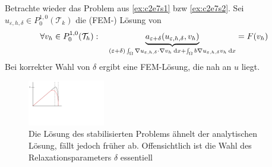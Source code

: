 \documentclass[../skript.tex]{subfiles}
\begin{document}
 \begin{example}\label{ex:c2e7s3}
 	Betrachte wieder das Problem aus \cref{ex:c2e7s1} bzw \cref{ex:c2e7s2}. Sei $u_{\varepsilon,h,\delta}\in P^{1,0}_0(\mathcal{T}_k)$ die (FEM-) Lösung von
 	\[
 		\forall v_h\in P^{1,0}_0(\mathcal{T}_h):\quad \underbrace{a_{\varepsilon+\delta}(u_{\varepsilon,h,\delta}, v_h)}_{(\varepsilon+\delta)\int_\Omega\nabla u_{\varepsilon,h,\delta} \cdot\nabla v_h\:\mathrm{d}x + \int_\Omega b\nabla u_{\varepsilon,h,\delta}v_h\:\mathrm{d}x} = F(v_h)
 	\] 
 	Bei korrekter Wahl von $\delta$ ergibt eine FEM-Lösung, die nah an $u$ liegt.
 	\begin{figure}[ht]
 	\centering
 		\includegraphics[width=0.3\textwidth]{Images/5-12-stabilisiert.pdf}
 		\caption{Die Lösung des stabilisierten Problems ähnelt der analytischen Lösung, fällt jedoch früher ab. Offensichtlich ist die Wahl des Relaxationsparameters $\delta$ essentiell}
 		\label{figure_stabilisiert}
 	\end{figure}
 \end{example}
\end{document}
